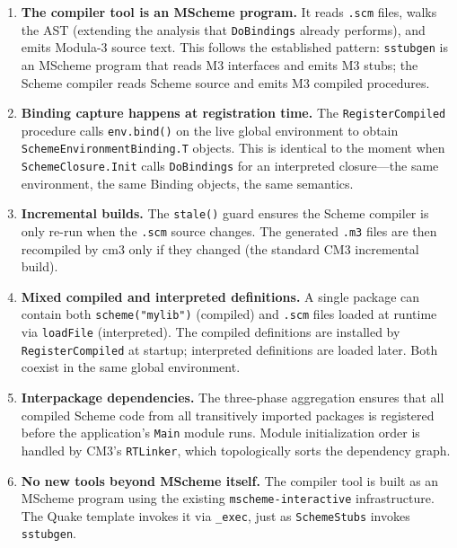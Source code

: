 \documentclass[12pt]{report}
\begin{document}
\begin{enumerate}
\item \textbf{The compiler tool is an MScheme program.}
  It reads \texttt{.scm} files, walks the AST (extending the
  analysis that \texttt{DoBindings} already performs), and emits
  Modula-3 source text.  This follows the established pattern:
  \texttt{sstubgen} is an MScheme program that reads M3 interfaces
  and emits M3 stubs; the Scheme compiler reads Scheme source and
  emits M3 compiled procedures.

\item \textbf{Binding capture happens at registration time.}
  The \texttt{RegisterCompiled} procedure calls \texttt{env.bind()}
  on the live global environment to obtain
  \texttt{SchemeEnvironmentBinding.T} objects.  This is identical
  to the moment when \texttt{SchemeClosure.Init} calls
  \texttt{DoBindings} for an interpreted closure---the same
  environment, the same Binding objects, the same semantics.

\item \textbf{Incremental builds.}  The \texttt{stale()} guard
  ensures the Scheme compiler is only re-run when the \texttt{.scm}
  source changes.  The generated \texttt{.m3} files are then
  recompiled by cm3 only if they changed (the standard CM3
  incremental build).

\item \textbf{Mixed compiled and interpreted definitions.}
  A single package can contain both \texttt{scheme("mylib")} (compiled)
  and \texttt{.scm} files loaded at runtime via \texttt{loadFile}
  (interpreted).  The compiled definitions are installed by
  \texttt{RegisterCompiled} at startup; interpreted definitions are
  loaded later.  Both coexist in the same global environment.

\item \textbf{Interpackage dependencies.}  The three-phase
  aggregation ensures that all compiled Scheme code from all
  transitively imported packages is registered before the
  application's \texttt{Main} module runs.  Module initialization
  order is handled by CM3's \texttt{RTLinker}, which topologically
  sorts the dependency graph.

\item \textbf{No new tools beyond MScheme itself.}  The compiler
  tool is built as an MScheme program using the existing
  \texttt{mscheme-interactive} infrastructure.  The Quake template
  invokes it via \texttt{\_exec}, just as \texttt{SchemeStubs}
  invokes \texttt{sstubgen}.
\end{enumerate}
\end{document}
